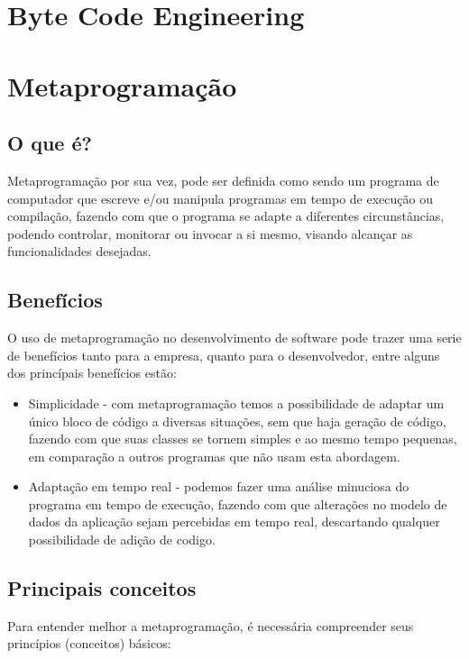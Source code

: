 \documentclass[tc,openright]{iiufrgs}
\begin{document}
\chapter{Byte Code Engineering}

\chapter{Metaprogramação}

\section{O que é?}

Metaprogramação por sua vez, pode ser definida como sendo um programa de computador que escreve e/ou manipula programas em tempo de execução ou compilação, fazendo com que o programa se adapte a diferentes circunstâncias, podendo controlar, monitorar ou invocar a si mesmo, visando alcançar as funcionalidades desejadas. \cite{hazzard2013metaprogramming}
\section{Benefícios}
O uso de metaprogramação no desenvolvimento de software pode trazer uma serie de benefícios tanto para a empresa, quanto para o desenvolvedor, entre alguns dos princípais benefícios estão:

\begin{itemize}
\item Simplicidade - com metaprogramação temos a possibilidade de adaptar um único bloco de código a diversas situações, sem que haja geração de código, fazendo com que suas classes se tornem simples e ao mesmo tempo pequenas, em comparação a outros programas que não usam esta abordagem.
\item Adaptação em tempo real - podemos fazer uma análise minuciosa do programa em tempo de execução, fazendo com que alterações no modelo de dados da aplicação sejam percebidas em tempo real, descartando qualquer possibilidade de adição de codigo.
\end{itemize}

\section{Principais conceitos}
Para entender melhor a metaprogramação, é necessária compreender seus princípios (conceitos) básicos:
\end{document}
